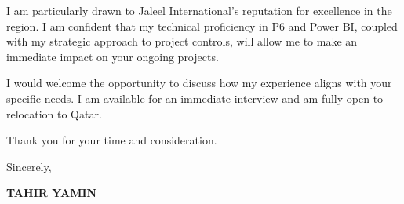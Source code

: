 \documentclass[11pt,a4paper]{article}
\begin{document}
I am particularly drawn to Jaleel International's reputation for excellence in the region. I am confident that my technical proficiency in P6 and Power BI, coupled with my strategic approach to project controls, will allow me to make an immediate impact on your ongoing projects.

I would welcome the opportunity to discuss how my experience aligns with your specific needs. I am available for an immediate interview and am fully open to relocation to Qatar.

Thank you for your time and consideration.

\vspace{0.5cm}
Sincerely,

\vspace{0.5cm}
\textbf{TAHIR YAMIN}
\end{document}

